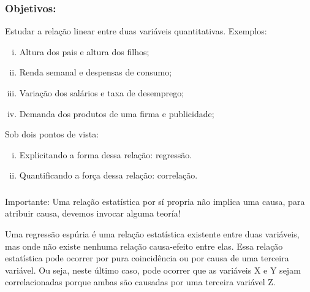 \documentclass[14pt,aspectratio=1610]{beamer}
\begin{document}
\begin{frame}{}
\frametitle{Objetivos:}
\begin{block}{}
\justifying
Estudar a relação linear entre duas variáveis quantitativas. Exemplos:
\begin{enumerate}[(i)]
\item Altura dos pais e altura dos filhos;\pause
\item Renda semanal e despensas de consumo;\pause
\item Variação dos salários e taxa de desemprego;\pause
\item Demanda dos produtos de uma firma e publicidade;\pause
\end{enumerate}
\end{block}
\begin{block}{}
\justifying
Sob dois pontos de vista:
\begin{enumerate}[(i)]
\item Explicitando a forma dessa relação: regressão.\pause
\item Quantificando a força dessa relação: correlação.
\end{enumerate}
\end{block}
\end{frame}

\begin{frame}{}
\frametitle{ }
\begin{block}{Importante:}
\justifying
Uma relação estatística por sí propria não implica uma causa, para atribuir causa, devemos invocar alguma teoría!
\end{block}
\pause
\begin{block}{}
\justifying
Uma regressão espúria é uma relação estatística existente entre duas variáveis, mas onde não existe nenhuma relação causa-efeito entre elas. Essa relação estatística pode ocorrer por pura coincidência ou por causa de uma terceira variável. Ou seja, neste último caso, pode ocorrer que as variáveis X e Y sejam correlacionadas porque ambas são causadas por uma terceira variável Z.
\end{block}
\end{frame}
\end{document}
